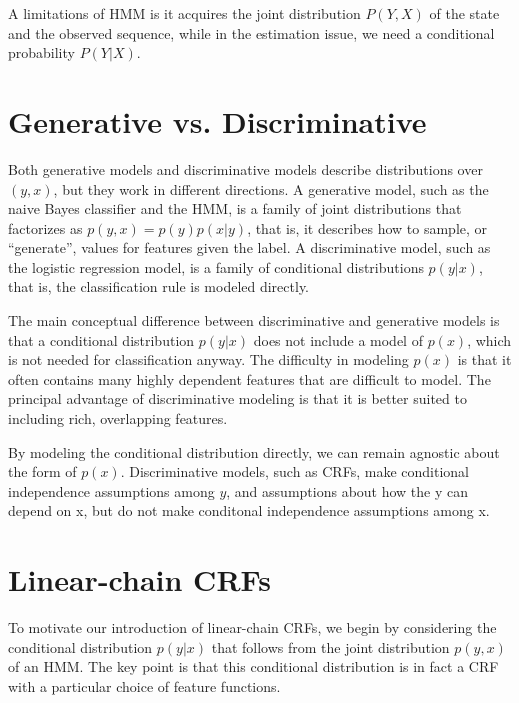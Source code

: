 \documentclass{article}
\begin{document}
A limitations of HMM is it acquires the joint distribution $P(Y, X)$ of the state and the observed sequence, while in the estimation issue, we need a conditional probability $P(Y|X)$.

\section{Generative vs. Discriminative}
Both generative models and discriminative models describe distributions over $(y,x)$, but they work in different directions. A generative model, such as the naive Bayes classifier and the HMM, is a family of joint distributions that factorizes as $p(y,x) = p(y)p(x|y)$, that is, it describes how to sample, or ``generate'', values for features given the label. A discriminative model, such as the logistic regression model, is a family of conditional distributions $p(y|x)$, that is, the classification rule is modeled directly. 


The main conceptual difference between discriminative and generative models is that a conditional distribution $p(y|x)$ does not include a model of $p(x)$, which is not needed for classification anyway. The difficulty in modeling $p(x)$ is that it often contains many highly dependent features that are difficult to model. The principal advantage of discriminative modeling is that it is better suited to including rich, overlapping features. 

By modeling the conditional distribution directly, we can remain agnostic about the form of $p(x)$. Discriminative models, such as CRFs, make conditional independence assumptions among $y$, and assumptions about how the y can depend on x, but do not make conditonal independence assumptions among x.

\section{Linear-chain CRFs}
To motivate our introduction of linear-chain CRFs, we begin by considering the conditional distribution $p(y|x)$ that follows from the joint distribution $p(y,x)$ of an HMM. The key point is that this conditional distribution is in fact a CRF with a particular choice of feature functions.
\end{document}
